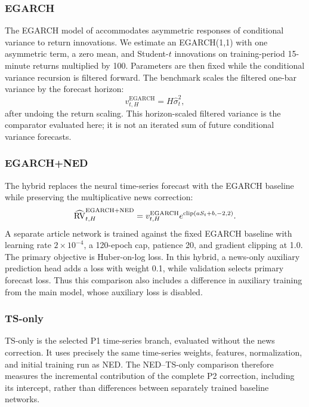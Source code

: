 \subsubsection{EGARCH}
The EGARCH model of \citet{Nelson_1991} accommodates asymmetric responses
of conditional variance to return innovations. We estimate an
EGARCH(1,1) with one asymmetric term, a zero mean, and Student-$t$
innovations on training-period 15-minute returns multiplied by 100.
Parameters are then fixed while the conditional variance recursion is
filtered forward. The benchmark scales the filtered one-bar variance
by the forecast horizon:
\begin{equation}
 v_{t,H}^{\mathrm{EGARCH}}=H\hat\sigma_t^2,\label{eq:egarch}
\end{equation}
after undoing the return scaling. This horizon-scaled filtered variance
is the comparator evaluated here; it is not an iterated sum of future
conditional variance forecasts.

\subsubsection{EGARCH+NED}
The hybrid replaces the neural time-series forecast with the EGARCH
baseline while preserving the multiplicative news correction:
\begin{equation}
 \widehat{\operatorname{RV}}_{t,H}^{\mathrm{EGARCH+NED}}=
 v_{t,H}^{\mathrm{EGARCH}}e^{\operatorname{clip}(aS_t+b,-2,2)}.\label{eq:egarch_ned}
\end{equation}
A separate article network is trained against the fixed EGARCH
baseline with learning rate $2\times10^{-4}$, a 120-epoch cap,
patience 20, and gradient clipping at 1.0. The primary objective is
Huber-on-log loss. In this hybrid, a news-only auxiliary prediction
head adds a loss with weight 0.1, while validation selects primary
forecast loss. Thus this comparison also includes a difference in
auxiliary training from the main model, whose auxiliary loss is disabled.

\subsubsection{TS-only}
TS-only is the selected P1 time-series branch, evaluated without the
news correction. It uses precisely the same time-series weights,
features, normalization, and initial training run as NED. The
NED--TS-only comparison therefore measures the incremental contribution
of the complete P2 correction, including its intercept, rather than
differences between separately trained baseline networks.

